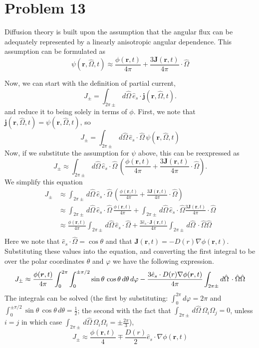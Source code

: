 \documentclass{article}
\newcommand{\Oh}{\hat{\Omega}}
\newcommand{\cur}{\bm{J}}
\newcommand{\rt}{(\bm{r},t)}
\newcommand{\rOt}{(\bm{r},\Oh,t)}
\begin{document}

\section*{Problem 13}

Diffusion theory is built upon the assumption that the angular flux can be adequately represented by a linearly anisotropic angular dependence. This assumption can be formulated as
$$\psi\rOt \approx \frac{\phi\rt}{4\pi} + \frac{3\cur\rt}{4\pi}\cdot \Oh$$

Now, we can start with the definition of partial current,
$$ J_{\pm} = \int_{2\pi\pm} d\Oh \, \hat{e}_s \cdot \bm{j}\rOt .$$
and reduce it to being solely in terms of $\phi$. First, we note that $\bm{j}\rOt = \psi\rOt$, so
$$ J_{\pm} = \int_{2\pi\pm} d\Oh \, \hat{e}_s \cdot \Oh \, \psi\rOt $$
Now, if we substitute the assumption for $\psi$ above, this can be reexpressed as
$$ J_{\pm} \approx \int_{2\pi\pm} d\Oh \, \hat{e}_s \cdot \Oh \, \left(\frac{\phi\rt}{4\pi} + \frac{3\cur\rt}{4\pi}\cdot \Oh\right) .$$
We simplify this equation
\begin{align*}
J_{\pm}	&\approx \int_{2\pi\pm} d\Oh \, \hat{e}_s \cdot \Oh \, \left(\frac{\phi\rt}{4\pi} + \frac{3\cur\rt}{4\pi}\cdot \Oh\right) \\
		&\approx \int_{2\pi\pm} d\Oh \, \hat{e}_s \cdot \Oh \, \frac{\phi\rt}{4\pi} + \int_{2\pi\pm} d\Oh \, \hat{e}_s \cdot \Oh \frac{3\cur\rt}{4\pi}\cdot \Oh \\
		&\approx \frac{\phi\rt}{4\pi} \int_{2\pi\pm} d\Oh \, \hat{e}_s \cdot \Oh + \frac{3\hat{e}_s \cdot \cur\rt}{4\pi} \int_{2\pi\pm} d\Oh \, \cdot \Oh\Oh \\
\end{align*}
Here we note that $\hat{e}_s \cdot \Oh = \cos\theta$ and that $\cur\rt = -D(r)\nabla\phi\rt$. Substituting these values into the equation, and converting the first integral to be over the polar coordinates $\theta$ and $\varphi$ we have the following expression.
$$ J_{\pm} \approx \frac{\phi\rt}{4\pi} \int_{0}^{2\pi}\int_{0}^{\pm\pi/2} \sin\theta \, \cos\theta \, d\theta \, d\varphi - \frac{3\hat{e}_s\cdot D(r)\nabla\phi\rt}{4\pi} \int_{2\pi\pm} d\Oh \, \cdot \Oh\Oh \\$$
The integrals can be solved (the first by substituting: $\int_{0}^{2\pi}d\varphi = 2\pi$ and $\int_{0}^{\pm\pi/2}\sin\theta \, \cos\theta \, d\theta = \frac{1}{2}$; the second with the fact that $\int_{2\pi\pm} d\Oh \, \Omega_i\Omega_j = 0$, unless $i=j$ in which case $\int_{2\pi\pm} d\Oh \, \Omega_i\Omega_i = \pm\frac{2\pi}{3}$),
$$ J_{\pm} \approx \frac{\phi\rt}{4} \mp \frac{D(r)}{2}\hat{e}_s \cdot \nabla\phi\rt$$






\end{document}
